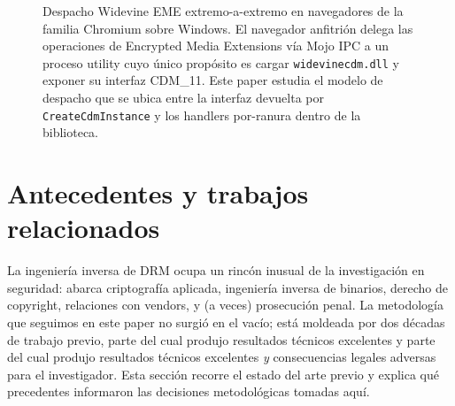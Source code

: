 \documentclass[11pt,letterpaper]{article}
\let\oldsection\section
\renewcommand{\section}{\clearpage\oldsection}
\begin{document}
\begin{figure}[t]
\centering
{}
\caption{Despacho Widevine EME extremo-a-extremo en navegadores
de la familia Chromium sobre Windows. El navegador anfitrión
delega las operaciones de Encrypted Media Extensions vía Mojo IPC
a un proceso utility cuyo único propósito es cargar
\texttt{widevinecdm.dll} y exponer su interfaz CDM\_11. Este paper
estudia el modelo de despacho que se ubica entre la interfaz
devuelta por \texttt{CreateCdmInstance} y los handlers por-ranura
dentro de la biblioteca.}
\label{fig:system-overview}
\end{figure}

\section{Antecedentes y trabajos relacionados}
\label{sec:antecedents}

La ingeniería inversa de DRM ocupa un rincón inusual de la
investigación en seguridad: abarca criptografía aplicada,
ingeniería inversa de binarios, derecho de copyright, relaciones
con vendors, y (a veces) prosecución penal. La metodología que
seguimos en este paper no surgió en el vacío; está moldeada por
dos décadas de trabajo previo, parte del cual produjo resultados
técnicos excelentes y parte del cual produjo resultados técnicos
excelentes \emph{y} consecuencias legales adversas para el
investigador. Esta sección recorre el estado del arte previo y
explica qué precedentes informaron las decisiones metodológicas
tomadas aquí.
\end{document}

